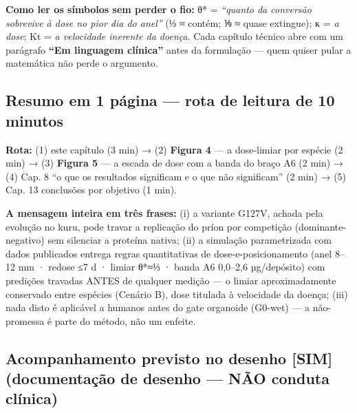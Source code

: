 \documentclass[12pt,a4paper,oneside]{report}
\begin{document}
\textbf{Como ler os símbolos sem perder o fio:} θ* = \emph{``quanto da
conversão sobrevive à dose no pior dia do anel''} (⅓ ≈ contém; ⅑ ≈ quase
extingue); κ = \emph{a dose}; Kt = \emph{a velocidade inerente da
doença}. Cada capítulo técnico abre com um parágrafo \textbf{``Em
linguagem clínica''} antes da formulação --- quem quiser pular a
matemática não perde o argumento.

\hypertarget{resumo-em-1-puxe1gina-rota-de-leitura-de-10-minutos}{%
\subsection{Resumo em 1 página --- rota de leitura de 10
minutos}\label{resumo-em-1-puxe1gina-rota-de-leitura-de-10-minutos}}

\textbf{Rota:} (1) este capítulo (3 min) → (2) \textbf{Figura 4} --- a
dose-limiar por espécie (2 min) → (3) \textbf{Figura 5} --- a escada de
dose com a banda do braço A6 (2 min) → (4) Cap. 8 ``o que os resultados
significam e o que não significam'' (2 min) → (5) Cap. 13 conclusões por
objetivo (1 min).

\textbf{A mensagem inteira em três frases:} (i) a variante G127V, achada
pela evolução no kuru, pode travar a replicação do príon por competição
(dominante-negativo) sem silenciar a proteína nativa; (ii) a simulação
parametrizada com dados publicados entrega regras quantitativas de
dose-e-posicionamento (anel 8--12 mm · redose ≤7 d · limiar θ*≈⅓ · banda
A6 0,0--2,6 µg/depósito) com predições travadas ANTES de qualquer
medição --- o limiar aproximadamente conservado entre espécies (Cenário
B), dose titulada à velocidade da doença; (iii) nada disto é aplicável a
humanos antes do gate organoide (G0-wet) --- a não-promessa é parte do
método, não um enfeite.

\hypertarget{acompanhamento-previsto-no-desenho-sim-documentauxe7uxe3o-de-desenho-nuxe3o-conduta-cluxednica}{%
\subsection{Acompanhamento previsto no desenho {[}SIM{]} (documentação
de desenho --- NÃO conduta
clínica)}\label{acompanhamento-previsto-no-desenho-sim-documentauxe7uxe3o-de-desenho-nuxe3o-conduta-cluxednica}}
\end{document}
